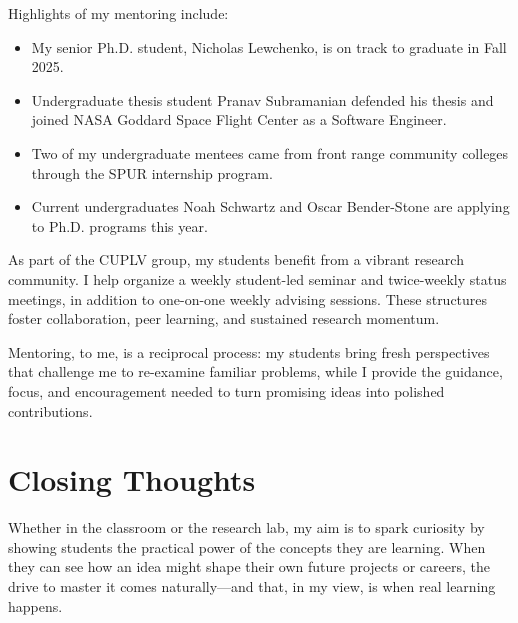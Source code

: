 Highlights of my mentoring include:
\begin{itemize}
    \item My senior Ph.D. student, Nicholas Lewchenko, is on track to graduate in Fall 2025.
    \item Undergraduate thesis student Pranav Subramanian defended his thesis and joined NASA Goddard Space Flight Center as a Software Engineer.
    \item Two of my undergraduate mentees came from front range community colleges through the SPUR internship program.
    \item Current undergraduates Noah Schwartz and Oscar Bender-Stone are applying to Ph.D. programs this year.
\end{itemize}

As part of the CUPLV group, my students benefit from a vibrant research community. I help organize a weekly student-led seminar and twice-weekly status meetings, in addition to one-on-one weekly advising sessions. These structures foster collaboration, peer learning, and sustained research momentum. 

Mentoring, to me, is a reciprocal process: my students bring fresh perspectives that challenge me to re-examine familiar problems, while I provide the guidance, focus, and encouragement needed to turn promising ideas into polished contributions.

\section*{Closing Thoughts}
Whether in the classroom or the research lab, my aim is to spark curiosity by showing students the practical power of the concepts they are learning. When they can see how an idea might shape their own future projects or careers, the drive to master it comes naturally—and that, in my view, is when real learning happens.
